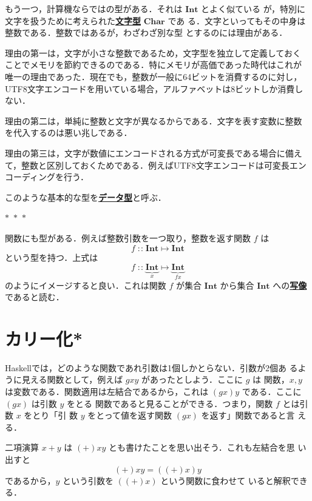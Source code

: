\documentclass[a5paper,twoside,fleqn,draft]{jsbook}
\newcommand{\separator}{\begin{center}$*$~$*$~$*$\end{center}}
\newcommand{\programminglanguage}[1]{\textsf{#1}}
\newcommand{\haskell}{\programminglanguage{Haskell}}
\newcommand{\keyword}[1]{{\underline{\textbf{#1}}}}
\DeclareMathOperator{\mIn}{{:\!:}}
\DeclareMathOperator{\mMapsTo}{\mapsto}
\newcommand{\mType}[1]{\mathbf{#1}}
\newcommand{\mCharType}{\mType{Char}}
\newcommand{\mIntType}{\mType{Int}}
\newcommand{\mProj}[2]{#1\mMapsTo#2}
\begin{document}
もう一つ，計算機ならではの型がある．それは $\mIntType$ とよく似ている
が，特別に文字を扱うために考えられた\keyword{文字型} $\mCharType$ であ
る．文字といってもその中身は整数である．整数ではあるが，わざわざ別な型
とするのには理由がある．

理由の第一は，文字が小さな整数であるため，文字型を独立して定義しておく
ことでメモリを節約できるのである．特にメモリが高価であった時代はこれが
唯一の理由であった．現在でも，整数が一般に64ビットを消費するのに対し，
UTF8文字エンコードを用いている場合，アルファベットは8ビットしか消費し
ない．

理由の第二は，単純に整数と文字が異なるからである．文字を表す変数に整数
を代入するのは悪い兆しである．

理由の第三は，文字が数値にエンコードされる方式が可変長である場合に備え
て，整数と区別しておくためである．例えばUTF8文字エンコードは可変長エン
コーディングを行う．

このような基本的な型を\keyword{データ型}と呼ぶ．

\separator

関数にも型がある．例えば整数引数を一つ取り，整数を返す関数 $f$ は
\begin{equation}
f\mIn\mProj{\mIntType}{\mIntType}
\end{equation}
という型を持つ．上式は
\begin{equation}
f \mIn\underbrace{\mIntType}_{x} \mMapsTo \underbrace{\mIntType}_{fx}
\end{equation}
のようにイメージすると良い．これは関数 $f$ が集合 $\mIntType$ から集合
$\mIntType$ への\keyword{写像}であると読む．

\section{カリー化*}

\haskell では，どのような関数であれ引数は1個しかとらない．引数が2個あ
るように見える関数として，例えば $gxy$ があったとしよう．ここに $g$ は
関数，$x,y$ は変数である．関数適用は左結合であるから，これは
$\left(gx\right)y$ である．ここに $\left(gx\right)$ は引数 $y$ をとる
関数であると見ることができる．つまり，関数 $f$ とは引数 $x$ をとり「引
  数 $y$ をとって値を返す関数 $\left(gx\right)$ を返す」関数であると言
える．

二項演算 $x+y$ は $(+)xy$ とも書けたことを思い出そう．これも左結合を思
い出すと
\begin{equation}
(+)xy=\left((+)x\right)y
\end{equation}
であるから，$y$ という引数を $\left((+)x\right)$ という関数に食わせて
いると解釈できる．
\end{document}

